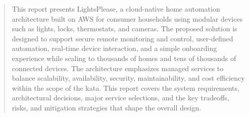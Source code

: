\documentclass[12pt]{article}
\begin{document}
\hypersetup{pageanchor=false}


\clearpage
\frontmatterpagesetup
\begin{abstract}
This report presents LightsPlease, a cloud-native home automation architecture built on AWS for consumer households using modular devices such as lights, locks, thermostats, and cameras. The proposed solution is designed to support secure remote monitoring and control, user-defined automation, real-time device interaction, and a simple onboarding experience while scaling to thousands of homes and tens of thousands of connected devices. The architecture emphasizes managed services to balance scalability, availability, security, maintainability, and cost efficiency within the scope of the kata. This report covers the system requirements, architectural decisions, major service selections, and the key tradeoffs, risks, and mitigation strategies that shape the overall design. 
\end{abstract}

\newpage
\tableofcontents

\newpage
\listoffigures
\listoftables

\clearpage
\mainmatterpagesetup













\label{LastMainPage}

\clearpage
\supplementpagesetup
\printbibliography[heading=bibintoc,title={References}]


\end{document}
